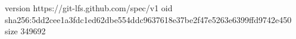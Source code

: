 version https://git-lfs.github.com/spec/v1
oid sha256:5dd2cee1a3fdc1ed62dbe554ddc9637618e37be2f47e5263e6399ffd9742e450
size 349692
